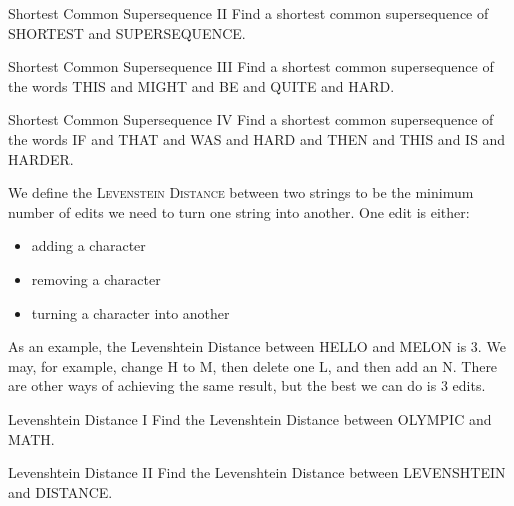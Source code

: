 \documentclass[12pt,letterpaper]{article}
\begin{document}
\begin{problem}{Shortest Common Supersequence II}
 Find a shortest common supersequence of SHORTEST and SUPERSEQUENCE.
\end{problem}

\begin{problem}{Shortest Common Supersequence III}
 Find a shortest common supersequence of the words THIS and MIGHT and BE and
 QUITE and HARD.
\end{problem}

\begin{problem}{Shortest Common Supersequence IV}
 Find a shortest common supersequence of the words IF and THAT and WAS and HARD
 and THEN and THIS and IS and HARDER.
\end{problem}

\vspace{2em}

We define the \textsc{Levenstein Distance} between two strings to be the minimum
number of edits we need to turn one string into another. One edit is either:
\begin{itemize}
 \item adding a character
 \item removing a character
 \item turning a character into another
\end{itemize}

As an example, the Levenshtein Distance between HELLO and MELON is $3$. We may,
for example, change H to M, then delete one L, and then add an N. There are
other ways of achieving the same result, but the best we can do is $3$ edits.

\begin{problem}{Levenshtein Distance I}
 Find the Levenshtein Distance between OLYMPIC and MATH.
\end{problem}

\begin{problem}{Levenshtein Distance II}
 Find the Levenshtein Distance between LEVENSHTEIN and DISTANCE.
\end{problem}
\end{document}
